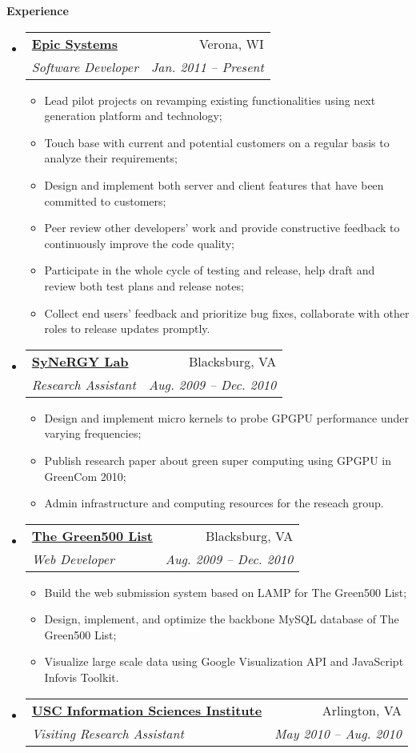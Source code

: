 \documentclass[letterpaper,11pt]{article}
\makeatletter
\newcommand{\resitem}[1]{\item #1 \vspace{-2pt}}
\newcommand{\resheading}[1]{{\large \colorbox{mygrey}{\begin{minipage}{\textwidth}{\textbf{#1 \vphantom{p\^{E}}}}\end{minipage}}}}
\newcommand{\ressubheading}[4]{
\begin{tabular*}{6.5in}{l@{\extracolsep{\fill}}r}
		\textbf{#1} & #2 \\
		\textit{#3} & \textit{#4} \\
\end{tabular*}\vspace{-6pt}}
\makeatother
\begin{document}
\resheading{Experience}
	\begin{itemize}
		\item 
			\ressubheading{\href{http://www.epic.com}{Epic Systems}}{Verona,
			WI}{Software Developer}{Jan. 2011 -- Present} { \footnotesize
				\begin{itemize}
				  	\resitem{Lead pilot projects on revamping existing functionalities using
				  	next generation platform and technology;} 
				  	\resitem{Touch base with current and potential customers on a regular
				  	basis to analyze their requirements;} 
				  	\resitem{Design and implement both server and client features that
					have been committed to customers;}
					\resitem{Peer review other developers' work and provide constructive
					feedback to continuously improve the code quality;}
					\resitem{Participate in the whole cycle of testing and release, help draft 
					and review both test plans and release notes;}
					\resitem{Collect end users' feedback and prioritize bug fixes, collaborate
					with other roles to release updates promptly.}
				\end{itemize}
				}
		\item 
			\ressubheading{\href{http://synergy.cs.vt.edu}{SyNeRGY Lab}}{Blacksburg,
			VA}{Research Assistant}{Aug. 2009 -- Dec. 2010} { \footnotesize
				\begin{itemize}
					\resitem{Design and implement micro kernels to probe GPGPU performance 
					under varying frequencies;}
					\resitem{Publish research paper about green super computing using GPGPU
					in GreenCom 2010;} 
					\resitem{Admin infrastructure and computing resources for the reseach group.}   
				\end{itemize}
				}
		\item 
			\ressubheading{\href{http://www.green500.org}{The Green500 List}}{Blacksburg,
			VA}{Web Developer}{Aug. 2009 -- Dec. 2010} { \footnotesize
				\begin{itemize} 
					\resitem{Build the web submission system based on LAMP for The Green500
					List;} 
					\resitem{Design, implement, and optimize the backbone MySQL database of The
					Green500 List;}
					\resitem{Visualize large scale data using Google Visualization API and
					JavaScript Infovis Toolkit.}
				\end{itemize}
				}
		\item 
			\ressubheading{\href{http://www.isi.edu}{USC Information Sciences Institute}}{Arlington,
			VA}{Visiting Research Assistant}{May 2010 -- Aug. 2010} { \footnotesize
}
\end{itemize}
\end{document}
